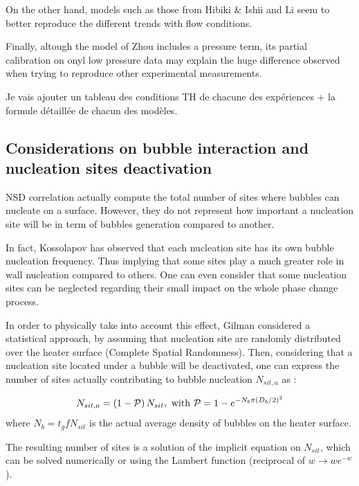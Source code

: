 On the other hand, models such as those from Hibiki \& Ishii and Li \etal seem to better reproduce the different trends with flow conditions. 

Finally, altough the model of Zhou \etal includes a pressure term, its partial calibration on onyl low pressure data may explain the huge difference observed when trying to reproduce other experimental measurements.

{\color{red} Je vais ajouter un tableau des conditions TH de chacune des expériences + la formule détaillée de chacun des modèles.}

\subsection{Considerations on bubble interaction and nucleation sites deactivation}

NSD correlation actually compute the total number of sites where bubbles can nucleate on a surface. However, they do not represent how important a nucleation site will be in term of bubbles generation compared to another. 

\npar
In fact, Kossolapov has observed that each nucleation site has its own bubble nucleation frequency. Thus implying that some sites play a much greater role in wall nucleation compared to others. One can even consider that some nucleation sites can be neglected regarding their small impact on the whole phase change process.

\npar

In order to physically take into account this effect, Gilman considered a statistical approach, by assuming that nucleation site are randomly distributed over the heater surface (Complete Spatial Randomness). Then, considering that a nucleation site located under a bubble will be deactivated, one can express the number of sites actually contributing to bubble nucleation $N_{sit,a}$ as :


\begin{align}
N_{sit,a}=\parth{1-\mathcal{P}}N_{sit},\ \text{with}\ \mathcal{P}=1-e^{-N_{b}\pi \parth{D_{b}/2}^{2}}
\end{align}
where $N_{b}=t_{g}fN_{sit}$ is the actual average density of bubbles on the heater surface.

\npar

The resulting number of sites is a solution of the implicit equation on $N_{sit}$, which can be solved numerically or using the Lambert function (reciprocal of $w\rightarrow we^{-w}$).

